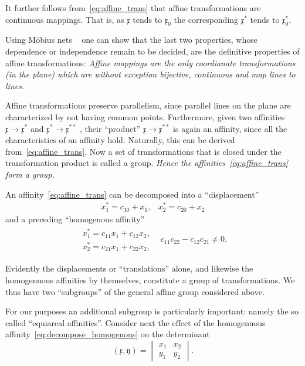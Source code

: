 \documentclass[11pt]{book} \usepackage{amssymb}
\newcommand{\myvec}[1]{\mathfrak{#1}}
\begin{document}
It further follows from~\ref{eq:affine_trans} that affine transformations are
continuous mappings. That is, as $\myvec{x}$ tends to $\myvec{x}_0$ the 
corresponding $\myvec{x}^*$ tends to $\myvec{x}^*_0$.

Using M\"obius nets ~\cite{Mobius:1827} one can show that the last
two properties, whose dependence or independence remain to be decided, are
the definitive properties of affine transformations: {\em Affine mappings are
the only coordianate transformations (in the plane) which are without
exception bijective, continuous and map lines to lines.}

Affine transformations preserve parallelism, since parallel lines on the plane
are characterized by not having common points. Furthermore, given two 
affinities $\myvec{x}\to\myvec{x}^*$ and $\myvec{x}^*\to\myvec{x}^{**}$ , their
``product'' $\myvec{x}\to\myvec{x}^{**}$ is again an affinity, since all the
characteristics of an affinity hold. Naturally, this can be derived 
from~\eqref{eq:affine_trans}. Now a set of transformations that is closed under
the transformation product is called a group. {\em Hence the 
affinities~\eqref{eq:affine_trans} form a group.}

An affinity~\eqref{eq:affine_trans} can be decomposed into a ``displacement''
\begin{equation}
  \label{eq:decompose_displacement}
  \begin{array}{ll}
    x_1^*=c_{10}+x_1,& x_2^*=c_{20}+x_2
  \end{array}
\end{equation}
and a preceding ``homogenous affinity''
\begin{equation}
  \label{eq:decompose_homogenous}
  \begin{array}{ll}
    \begin{array}{l}
      x_1^*=c_{11}x_1+c_{12}x_2,\\
      x_2^*=c_{21}x_1+c_{22}x_2,
    \end{array}
    & c_{11}c_{22}-c_{12}c_{21}\neq 0.
  \end{array}
\end{equation}

Evidently the displacements or ``translations'' alone, and likewise the 
homogenuous affinities by themselves, constitute a group of transformations.
We thus have two ``subgroups'' of the general affine group considered above.

For our purposes an additional subgroup is particularly important: namely the
so called ``equiareal affinities''. Consider next the effect of the homogenuous
affinity~\eqref{eq:decompose_homogenous} on the determinant
\begin{equation}
  \label{eq:xy_determinant}
  (\myvec{x},\myvec{y})=\begin{vmatrix}x_1&x_2\\y_1&y_2\end{vmatrix}.
\end{equation}
\end{document}
